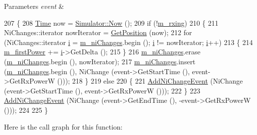 \begin{DoxyParams}{Parameters}
{\em event} & \\
\hline
\end{DoxyParams}

\begin{DoxyCode}
207 \{
208   \hyperlink{namespacens3_1_1TracedValueCallback_a7ffd3e7c142ffe7c8a1d2db9b8de38ec}{Time} now = \hyperlink{classns3_1_1Simulator_ac3178fa975b419f7875e7105be122800}{Simulator::Now} ();
209   \textcolor{keywordflow}{if} (!\hyperlink{classns3_1_1InterferenceHelper_a27ce49a3e1c7e7c6a178bc62071d89a6}{m\_rxing})
210     \{
211       NiChanges::iterator nowIterator = \hyperlink{classns3_1_1InterferenceHelper_aacb34f10699da1566ef896bc09f0f6c1}{GetPosition} (now);
212       \textcolor{keywordflow}{for} (NiChanges::iterator \hyperlink{bernuolliDistribution_8m_a6f6ccfcf58b31cb6412107d9d5281426}{i} = \hyperlink{classns3_1_1InterferenceHelper_adce3da8c009ac49e76c6feb633b82e55}{m\_niChanges}.begin (); \hyperlink{bernuolliDistribution_8m_a6f6ccfcf58b31cb6412107d9d5281426}{i} != nowIterator; 
      \hyperlink{bernuolliDistribution_8m_a6f6ccfcf58b31cb6412107d9d5281426}{i}++)
213         \{
214           \hyperlink{classns3_1_1InterferenceHelper_af11d32b96c9e19110deda5cd412574c1}{m\_firstPower} += \hyperlink{bernuolliDistribution_8m_a6f6ccfcf58b31cb6412107d9d5281426}{i}->GetDelta ();
215         \}
216       \hyperlink{classns3_1_1InterferenceHelper_adce3da8c009ac49e76c6feb633b82e55}{m\_niChanges}.erase (\hyperlink{classns3_1_1InterferenceHelper_adce3da8c009ac49e76c6feb633b82e55}{m\_niChanges}.begin (), nowIterator);
217       \hyperlink{classns3_1_1InterferenceHelper_adce3da8c009ac49e76c6feb633b82e55}{m\_niChanges}.insert (\hyperlink{classns3_1_1InterferenceHelper_adce3da8c009ac49e76c6feb633b82e55}{m\_niChanges}.begin (), NiChange (event->GetStartTime (), \textcolor{keyword}{
      event}->GetRxPowerW ()));
218     \}
219   \textcolor{keywordflow}{else}
220     \{
221       \hyperlink{classns3_1_1InterferenceHelper_a4e97729008bc32205eaa2132addf108b}{AddNiChangeEvent} (NiChange (event->GetStartTime (), \textcolor{keyword}{event}->GetRxPowerW ()));
222     \}
223   \hyperlink{classns3_1_1InterferenceHelper_a4e97729008bc32205eaa2132addf108b}{AddNiChangeEvent} (NiChange (event->GetEndTime (), -\textcolor{keyword}{event}->GetRxPowerW ()));
224 
225 \}
\end{DoxyCode}


Here is the call graph for this function\+:




